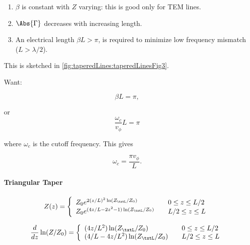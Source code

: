 \begin{enumerate}
\item \( \beta \) is constant with \( Z \) varying: this is good only for TEM lines.
\item \( \Abs{\Gamma} \) decreases with increasing length.
\item An electrical length \( \beta L > \pi \), is required to minimize low frequency mismatch (\( L > \lambda/2\)).
\end{enumerate}

This is sketched in \cref{fig:taperedLines:taperedLinesFig3}.


Want:

\begin{dmath}\label{eqn:continuumAndOtherTransformersCore:760}
\beta L = \pi,
\end{dmath}

or
\begin{dmath}\label{eqn:continuumAndOtherTransformersCore:780}
\frac{\omega_c}{v_\phi} L = \pi
\end{dmath}

where \( \omega_c \) is the cutoff frequency.  This gives

\begin{dmath}\label{eqn:continuumAndOtherTransformersCore:800}
\omega_c = \frac{\pi v_\phi}{L}.
\end{dmath}

\paragraph{Triangular Taper}

\begin{equation}\label{eqn:continuumAndOtherTransformersCore:960}
Z(z) = 
\left\{
\begin{array}{l l}
Z_0 e^{2(z/L)^2 \ln(Z_\txtL/Z_0)} & \quad \mbox{\( 0 \le z \le L/2\)} \\
Z_0 e^{(4z/L - 2 z^2 - 1) \ln(Z_\txtL/Z_0)} & \quad \mbox{\( L/2 \le z \le L\)} \\
\end{array}
\right.
\end{equation}

\begin{equation}\label{eqn:continuumAndOtherTransformersCore:980}
\frac{d}{dz} \ln (Z/Z_0) = 
\left\{
\begin{array}{l l}
{(4z/L^2) \ln(Z_\txtL/Z_0)} & \quad \mbox{\( 0 \le z \le L/2\)} \\
{(4/L - 4z/L^2) \ln(Z_\txtL/Z_0)} & \quad \mbox{\( L/2 \le z \le L\)} \\
\end{array}
\right.
\end{equation}

